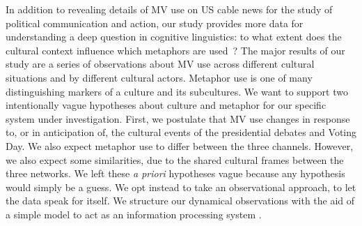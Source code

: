 In addition to revealing details of MV use on US cable news for the study
of political communication and action, our study
provides more data for understanding a deep question in 
cognitive linguistics: to what extent does the cultural context
influence which metaphors are used~\cite{Gibbs1997,Kovecses2010}?
The major results of our study are a series of observations about MV use
across different cultural situations and by different cultural actors. 
Metaphor use is one of many distinguishing markers of a culture and its subcultures. 
We want to support two intentionally vague hypotheses about
culture and metaphor for our specific system under investigation. 
First, we postulate that MV use changes 
in response to, or in anticipation of, the cultural events of the 
presidential debates and Voting Day.
We also expect metaphor use to differ between the three channels. 
However, we also expect some similarities, due to the shared cultural 
frames between the three networks. We left these \emph{a priori} hypotheses
vague because any hypothesis would simply be a guess. We opt instead to take
an observational approach, to let
the data speak for itself. We structure our dynamical observations
with the aid of a simple model to 
act as an information processing system \cite{McElreath2016}.
